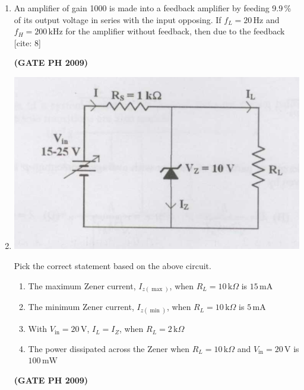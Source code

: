 \documentclass[14pt, a4paper]{extarticle}
\begin{document}
\begin{enumerate}[label=\textbf{Q. \arabic*}, start=21]
\item An amplifier of gain 1000 is made into a feedback amplifier by feeding 9.9\,\% of its output voltage in series with the input opposing. If $f_L = 20\,\text{Hz}$ and $f_H = 200\,\text{kHz}$ for the amplifier without feedback, then due to the feedback [cite: 8]
    \begin{enumerate}
    \end{enumerate}
    \hfill \textbf{(GATE PH 2009)}

\item \leavevmode \par
    \begin{center}
        \includegraphics[width=0.6\columnwidth]{figs/Q40fig.png}
        \label{fig:q40}
    \end{center}
Pick the correct statement based on the above circuit.
\begin{enumerate}
\item The maximum Zener current, $I_{z(\max)}$, when $R_L = 10\,\text{k}\Omega$ is $15\,\text{mA}$
\item The minimum Zener current, $I_{z(\min)}$, when $R_L = 10\,\text{k}\Omega$ is $5\,\text{mA}$
\item With $V_{\text{in}} = 20\,\text{V}$, $I_L = I_Z$, when $R_L = 2\,\text{k}\Omega$
\item The power dissipated across the Zener when $R_L = 10\,\text{k}\Omega$ and $V_{\text{in}} = 20\,\text{V}$ is $100\,\text{mW}$
\end{enumerate}
\hfill \textbf{(GATE PH 2009)}



\end{enumerate}
\end{document}
